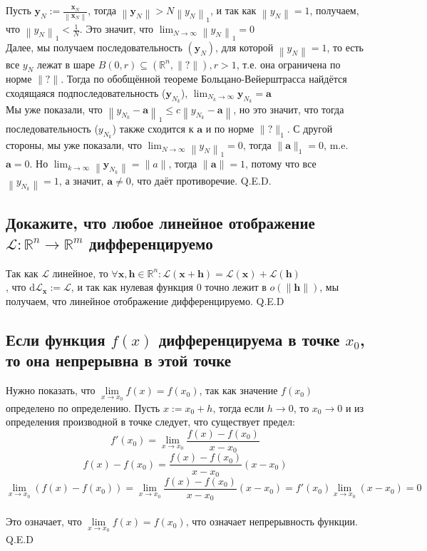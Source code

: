 \documentclass[a4paper]{article}
\begin{document}
Пусть $\mathbf{y}_N:=\frac{\mathbf{x}_N}{\left\|\mathbf{x}_N\right\|}$, тогда $\left\|\mathbf{y}_N\right\|>N\left\|y_N\right\|_1$, и так как $\left\|y_N\right\|=1$, получаем, что $\left\|y_N\right\|_1<\frac{1}{N}$. Это значит, что $\lim _{N \rightarrow \infty}\left\|y_N\right\|_1=0$\\[2mm]
\indent Далее, мы получаем последовательность $\left(\mathbf{y}_N\right)$, для которой $\left\|y_N\right\|=1$, то есть все $y_N$ лежат в шаре $B(0, r) \subseteq\left(\mathbb{R}^n,\|?\|\right), r>1$, т.е. она ограничена по норме $\|?\|$. Тогда по обобщённой теореме Больцано-Вейерштрасса найдётся сходящаяся подпоследовательность ($\mathbf{y}_{N_k}$), $\lim _{N_k \rightarrow \infty} \mathbf{y}_{N_k}=\mathbf{a}$\\[2mm]
\indent Мы уже показали, что $\left\|y_{N_k}-\mathbf{a}\right\|_1 \leq c\left\|y_{N_k}-\mathbf{a}\right\|$, но это значит, что тогда последовательность ($y_{N_k}$) также сходится к $\mathbf{a}$ и по норме $\|?\|_1$. С другой стороны, мы уже показали, что $\lim _{N \rightarrow \infty}\left\|y_N\right\|_1=0$, тогда $\|\mathbf{a}\|_1=0$, m.e. $\mathbf{a}=0$. Но $\lim _{k \rightarrow \infty}\left\|\mathbf{y}_{N_k}\right\|=\|a\|$, тогда $\|\mathbf{a}\|=1$, потому что все $\left\|y_{N_k}\right\|=1$, а значит, $\mathbf{a} \neq 0$, что даёт противоречие. Q.E.D.

\subsection{Докажите, что любое линейное отображение $\mathscr{L}: \mathbb{R}^n \rightarrow\mathbb{R}^m$ дифференцируемо}
Так как $\mathscr{L}$ линейное, то $\forall \mathbf{x},\mathbf{h}\in\mathbb{R}^n: \mathscr{L}(\mathbf{x}+\mathbf{h})=\mathscr{L}(\mathbf{x})+\mathscr{L}(\mathbf{h})$\\[2mm]
, что d$\mathscr{L}_\mathbf{x}:=\mathscr{L}$, и так как нулевая функция 0 точно лежит в $o(\|\mathbf{h}\|)$, мы получаем, что линейное отображение дифференцируемо. Q.E.D

\subsection{Если функция $f(x)$ дифференцируема в точке $x_0$, то она непрерывна в этой точке}

Нужно показать, что $\lim\limits_{x\rightarrow x_0} f(x)=f(x_0)$, так как значение $f(x_0)$ определено по определению. Пусть $x:=x_0+h$, тогда если $h\rightarrow0$, то $x_0\rightarrow0$ и из определения производной в точке следует, что существует предел:
$$f'(x_0)=\lim\limits_{x\rightarrow x_0} \frac{f(x)-f(x_0)}{x-x_0}$$
$$f(x)-f(x_0)=\frac{f(x)-f(x_0)}{x-x_0}(x-x_0)$$
$$\lim\limits_{x\rightarrow x_0} (f(x)-f(x_0))=\lim\limits_{x\rightarrow x_0} \frac{f(x)-f(x_0)}{x-x_0}(x-x_0)=f'(x_0)\lim\limits_{x\rightarrow x_0} (x-x_0)=0$$\\
Это означает, что $\lim\limits_{x\rightarrow x_0} f(x)=f(x_0)$, что означает непрерывность функции. Q.E.D
\end{document}
